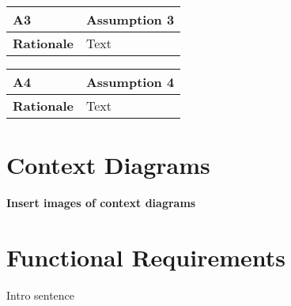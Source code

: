 \documentclass [11pt]{article}
\begin{document}
\begin{longtable}{| p{ } | p{ } | }\hline 
\rowcolor{tableCell}\textbf{A3} & Assumption 3 \\ \hline
\textbf{Rationale} &  Text \\ \hline
\end{longtable}

\begin{longtable}{| p{ } | p{ } | }\hline 
\rowcolor{tableCell}\textbf{A4} &Assumption 4 \\ \hline
\textbf{Rationale} &  Text\\ \hline
\end{longtable}



\section{Context Diagrams}
\textbf{Insert images of context diagrams}



\section {Functional Requirements} 
Intro sentence



\end{document}
